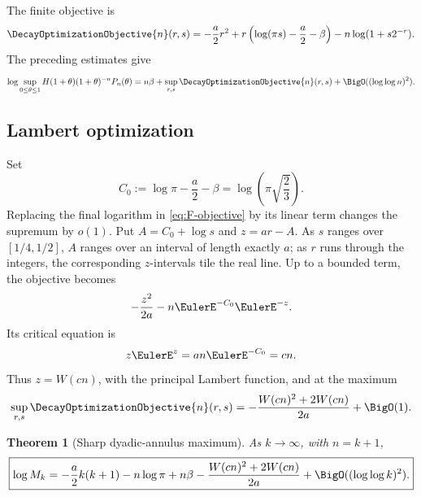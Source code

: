 \documentclass[11pt]{article}
\newtheorem{theorem}{Theorem}[section]
\theoremstyle{definition}
\theoremstyle{remark}
\begin{document}
The finite objective is
\begin{equation}
 \DecayOptimizationObjective{n}(r,s)
 =-\frac a2r^2
 +r\left(\log(\pi s)-\frac a2-\beta\right)
 -n\log(1+s2^{-r}).
 \label{eq:F-objective}
\end{equation}
The preceding estimates give
\begin{equation}
 \log\sup_{0\le\theta\le1}
 H(1+\theta)(1+\theta)^{-n}P_n(\theta)
 =n\beta+\sup_{r,s}\DecayOptimizationObjective{n}(r,s)
 +\BigO((\log\log n)^2).
 \label{eq:Fn-reduction}
\end{equation}

\subsection{Lambert optimization}

Set
\begin{equation}
 C_0:=\log\pi-\frac a2-\beta
 =\log\!\left(\pi\sqrt{\frac23}\right).
 \label{eq:C0}
\end{equation}
Replacing the final logarithm in \eqref{eq:F-objective} by its linear term
changes the supremum by \(o(1)\).  Put
\(A=C_0+\log s\) and \(z=ar-A\).  As \(s\) ranges over \([1/4,1/2]\),
\(A\) ranges over an interval of length exactly \(a\); as \(r\) runs through
the integers, the corresponding \(z\)-intervals tile the real line.  Up to a
bounded term, the objective becomes
\begin{equation}
 -\frac{z^2}{2a}-n\EulerE^{-C_0}\EulerE^{-z}.
 \label{eq:z-objective}
\end{equation}
Its critical equation is
\begin{equation}
 z\EulerE^z=an\EulerE^{-C_0}=cn.
 \label{eq:Lambert-eq}
\end{equation}
Thus \(z=W(cn)\), with the principal Lambert function\cite{corless}, and at the maximum
\begin{equation}
 \sup_{r,s}\DecayOptimizationObjective{n}(r,s)
 =-\frac{W(cn)^2+2W(cn)}{2a}+\BigO(1).
 \label{eq:Lambert-sup}
\end{equation}

\begin{theorem}[Sharp dyadic-annulus maximum]
\label{thm:annulus}
As \(k\to\infty\), with \(n=k+1\),
\begin{equation}
 \boxed{
 \log M_k
 =-\frac a2k(k+1)-n\log\pi+n\beta
 -\frac{W(cn)^2+2W(cn)}{2a}
 +\BigO((\log\log k)^2).}
 \label{eq:annulus-main}
\end{equation}
\end{theorem}
\end{document}
